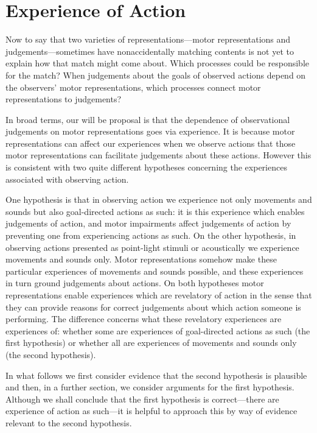 \documentclass[12pt,\papersize]{extarticle}
\begin{document}
\section{Experience of Action}
\label{sec:processes}
Now to say that two varieties of representations---motor representations and judgements---sometimes have nonaccidentally matching contents is not yet to explain how that match might come about.  Which processes could be responsible for the match?  When judgements about the goals of observed actions depend on the observers' motor representations, which processes connect motor representations to judgements?  

In broad terms, our will be proposal is that the dependence of observational judgements on motor representations goes via experience.  It is because motor representations can affect our experiences when we observe actions that those motor representations can facilitate judgements about these actions.  However this is consistent with two quite different hypotheses concerning the experiences associated with observing action.

One hypothesis is that in observing action we experience not only movements and sounds but also goal-directed actions as such: it is this experience which enables judgements of action, and motor impairments affect judgements of action by preventing one from experiencing actions as such. On the other hypothesis, in observing actions presented as point-light stimuli or acoustically we experience movements and sounds only. Motor representations somehow make these particular experiences of movements and sounds possible, and these experiences in turn ground judgements about actions.  On both hypotheses motor representations enable experiences which are revelatory of action in the sense that they can provide reasons for correct judgements about which action someone is performing.  The difference concerns what these revelatory experiences are experiences of: whether some are experiences of goal-directed actions as such (the first hypothesis) or whether all are experiences of movements and sounds only (the second hypothesis).  


In what follows we first consider evidence that the second hypothesis is plausible and then, in a further section, we consider arguments for the first hypothesis.  Although we shall conclude that the first hypothesis is correct---there are experience of action as such---it is helpful to approach this by way of evidence relevant to the second hypothesis.
\end{document}
